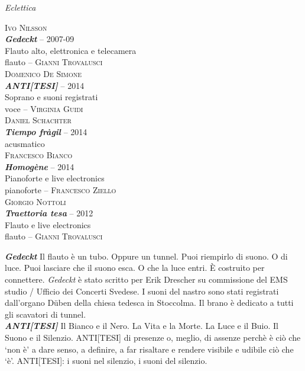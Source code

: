 \documentclass[9pt, twoside, a5paper]{extreport}
\newcommand{\brano}[6]{%
\noindent \textsc{#1}\\ %
\noindent \textbf{\textit{#2}} -- #3\\%
\noindent #4\\ %
\noindent #5 -- \textsc{#6}%
\\
}%
\newcommand{\installazione}[4]{%
\noindent \textsc{#1}\\ %
\noindent \textbf{\textit{#2}} -- #3\\%
\noindent #4%
\\
}%
\newcommand{\descrizione}[2]{%
\noindent \textbf{\textit{#1}} %
#2 %
\\
}%
\begin{document}
{\fontsize{30}{30}\selectfont \textit{Eclettica}}


\bigskip

\begin{multicols}{2}

\brano{Ivo Nilsson}
{Gedeckt}{2007-09}
{Flauto alto, elettronica e telecamera}
{flauto}{Gianni Trovalusci}


\brano{Domenico De Simone}
{ANTI[TESI]}{2014}
{Soprano e suoni registrati}
{voce}{Virginia Guidi}


\installazione{Daniel Schachter}
{Tiempo fràgil}{2014}
{acusmatico}


\brano{Francesco Bianco}
{Homogène}{2014}
{Pianoforte e live electronics}
{pianoforte}{Francesco Ziello}


\brano{Giorgio Nottoli}
{Traettoria tesa}{2012}
{Flauto e live electronics}
{flauto}{Gianni Trovalusci}


%
%
\vspace{5cm}


\descrizione{Gedeckt}{Il flauto è un tubo. Oppure un tunnel. Puoi riempirlo di suono. O di luce. Puoi lasciare che il suono esca. O che la luce entri. È costruito per connettere. \textit{Gedeckt} è stato scritto per Erik Drescher su commissione del EMS studio / Ufficio dei Concerti Svedese. I suoni del nastro sono stati registrati dall'organo Düben della chiesa tedesca in Stoccolma. Il brano è dedicato a tutti gli scavatori di tunnel.}


\descrizione{ANTI[TESI]}{Il Bianco e il Nero. La Vita e la Morte. La Luce e il Buio. Il Suono e il Silenzio. ANTI[TESI] di presenze o, meglio, di assenze perchè è ciò che ‘non è’ a dare senso, a definire, a far risaltare e rendere visibile e udibile ciò che ‘è’. ANTI[TESI]: i suoni nel silenzio, i suoni del silenzio.}


\end{multicols}
\end{document}
